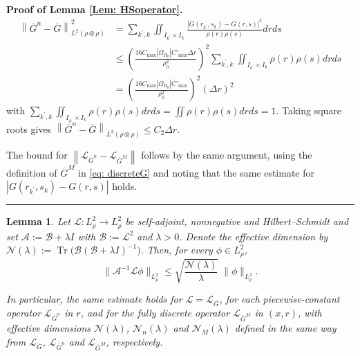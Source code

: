 \documentclass[12pt]{article}
\def\Gbar{ {\overline{G}} }
\newtheorem{lemma}[theorem]{Lemma}
\newenvironment{proof}[1][Proof]{\noindent\textbf{#1.} }{\ \rule{0.5em}{0.5em}}
\numberwithin{equation}{section}
\numberwithin{theorem}{section}
\begin{document}
\begin{proof}[Proof of Lemma \ref{Lem: HSoperator}]
$$
\begin{aligned}
\left\|\Gbar^n-\Gbar\right\|_{L^2(\rho \otimes \rho)}^2  
& =\sum_{k^{'}, k} \iint_{I_{k^{'}} \times I_k} \frac{\left|G\left(r_{k^{'}}, s_k\right)-G(r, s)\right|^2}{\rho(r) \rho(s)} d r d s \\
& \leq\left(\frac{16 C_{\max }\left|\Omega_{R_0}\right| C'_{\max} \Delta r}{\rho_0^2}\right)^2 \sum_{k^{'}, k} \iint_{I_{k^{'}} \times I_k} \rho(r) \rho(s) d r d s \\
& =\left(\frac{16 C_{\max }\left|\Omega_{R_0}\right| C'_{\max}}{\rho_0^2}\right)^2(\Delta r)^2
\end{aligned}
$$
with  $\sum_{k^{'}, k} \iint_{I_{k^{'}} \times I_k} \rho(r) \rho(s) d r d s=\iint \rho(r) \rho(s) d r d s=1$.
Taking square roots gives $\left\|\Gbar^n-\Gbar\right\|_{L^2(\rho \otimes \rho)} \leq C_2 \Delta r$. 

The bound for $\left\|\mathcal{L}_{\Gbar^n}- \mathcal{L}_{\Gbar^M} \right\|$ follows by the same argument, using the definition of $\Gbar^M$ in \eqref{eq: discreteG} and noting that the same estimate for $\left|G\left(r_{k^{'}}, s_k\right)-G(r, s)\right|$ holds. 
\end{proof}


\begin{lemma}\label{lem:effdim}
Let $\mathcal{L}:L_\rho^2\to L_\rho^2$ be self-adjoint, nonnegative and Hilbert--Schmidt and set $\mathcal{A}:=\mathcal{B}+\lambda I$ with $ \mathcal{B}:=\mathcal{L}^2$ and $\lambda>0$. 
Denote the effective dimension by $
\mathcal{N}(\lambda)
:= \operatorname{Tr}\bigl(\mathcal{B}(\mathcal{B}+\lambda I)^{-1}\bigr).
$
Then, for every $\phi\in L_\rho^2$,
$$
\|\mathcal{A}^{-1}\mathcal{L}\phi\|_{L_\rho^2}
\le \sqrt{\frac{\mathcal{N}(\lambda)}{\lambda}}\;\|\phi\|_{L_\rho^2}.
$$

In particular, the same estimate holds for 
$\mathcal{L}=\mathcal{L}_{\Gbar}$, for each piecewise-constant operator 
$\mathcal{L}_{\Gbar^n}$ in $r$, and for the fully discrete operator 
$\mathcal{L}_{\Gbar^M}$ in $(x,r)$, with effective dimensions
$\mathcal{N}(\lambda)$, $\mathcal{N}_n(\lambda)$ and $\mathcal{N}_M(\lambda)$
defined in the same way from $\mathcal{L}_{\Gbar}$, $\mathcal{L}_{\Gbar^n}$ 
and $\mathcal{L}_{\Gbar^M}$, respectively.
\end{lemma}
\end{document}
